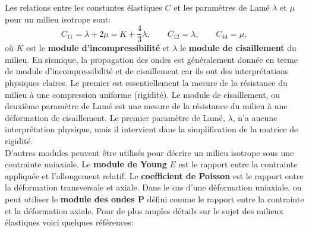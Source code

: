 Les relations entre les constantes élastiques $C$  et les paramètres de Lamé $\lambda$ et $\mu$ pour un milieu isotrope sont:
\begin{equation}
C_{11} = \lambda + 2\mu = K + \frac{4}{3}\lambda, \qquad C_{12} = \lambda, \qquad C_{44}= \mu,
\end{equation} 
où $K$ est le \textbf{module d'incompressibilité} et $\lambda$ le \textbf{module de cisaillement} du milieu.
En sismique, la propagation des ondes est généralement donnée en terme de module d'incompressibilité et de cisaillement car ils ont des interprétations physiques claires. Le premier est essentiellement la mesure de la résistance du milieu à une compression uniforme (rigidité). Le module de cisaillement, ou deuxième paramètre de Lamé est une mesure de la résistance du milieu à une déformation de cisaillement. Le premier paramètre de Lamé, $\lambda$, n'a aucune interprétation physique, mais il intervient dans la simplification de la matrice de rigidité. \\
D'autres modules peuvent être utilisés pour décrire un milieu isotrope sous une contrainte uniaxiale. Le \textbf{module de Young} $E$ est le rapport entre la contrainte appliquée et l'allongement relatif. Le \textbf{coefficient de Poisson} est le rapport entre la déformation transversale et axiale. Dans le cas d'une déformation uniaxiale, on peut utiliser le \textbf{module des ondes P} défini comme le rapport entre la contrainte et la déformation axiale. Pour de plus amples détails sur le sujet des milieux élastiques voici quelques références: \citet{Bourbie1986,Carcione2007,Mavko2009} 
